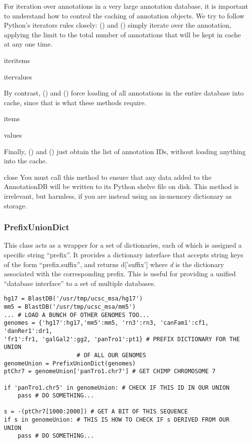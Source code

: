 \documentclass{howto}
\begin{document}
For iteration over annotations in a very large annotation database, it is
important to understand how to control the caching of annotation objects.
We try to follow Python's iterators rules closely: ()
and () simply iterate over the annotation, applying
the  limit to the total number of annotations that will be
kept in cache at any one time.  
\begin{funcdesc}{iteritems}{}
\end{funcdesc}
\begin{funcdesc}{itervalues}{}
\end{funcdesc}
By contrast, () and ()
force loading of all annotations in the entire database into cache, since
that is what these methods require.
\begin{funcdesc}{items}{}
\end{funcdesc}
\begin{funcdesc}{values}{}
\end{funcdesc}
Finally, () and () just obtain the 
list of annotation IDs, without loading anything into the cache.

\begin{funcdesc}{close}{}
  You must call this method to ensure that any data added to the AnnotationDB
  will be written to its Python shelve file on disk.
  This method is irrelevant, but harmless,
  if you are instead using an in-memory dictionary as storage.
\end{funcdesc}


\subsubsection{PrefixUnionDict}
This class acts as a wrapper for a set of dictionaries, each
of which is assigned a specific string ``prefix''.  It provides
a dictionary interface that accepts string keys of the form
``prefix.suffix'', and returns d['suffix'] where {\em d} is
the dictionary associated with the corresponding prefix.  This
is useful for providing a unified ``database interface'' to a
set of multiple databases.
\begin{verbatim}
hg17 = BlastDB('/usr/tmp/ucsc_msa/hg17')
mm5 = BlastDB('/usr/tmp/ucsc_msa/mm5')
... # LOAD A BUNCH OF OTHER GENOMES TOO...
genomes = {'hg17':hg17,'mm5':mm5, 'rn3':rn3, 'canFam1':cf1, 'danRer1':dr1,
'fr1':fr1, 'galGal2':gg2, 'panTro1':pt1} # PREFIX DICTIONARY FOR THE UNION 
					 # OF ALL OUR GENOMES
genomeUnion = PrefixUnionDict(genomes)
ptChr7 = genomeUnion['panTro1.chr7'] # GET CHIMP CHROMOSOME 7

if 'panTro1.chr5' in genomeUnion: # CHECK IF THIS ID IN OUR UNION
    pass # DO SOMETHING...

s = -(ptChr7[1000:2000]) # GET A BIT OF THIS SEQUENCE
if s in genomeUnion: # THIS IS HOW TO CHECK IF s DERIVED FROM OUR UNION
    pass # DO SOMETHING... 
\end{verbatim}
\end{document}
